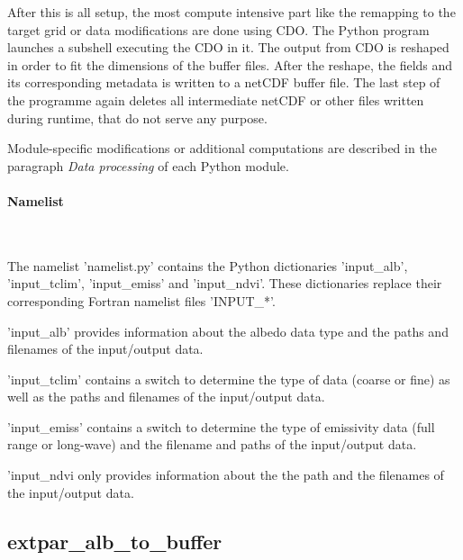 \documentclass[a4paper,10pt,DIV14,BCOR1cm,titlepage,twoside]{scrartcl}
\begin{document}
\noindent After this is all setup, the most compute intensive part like the remapping to the target grid or data modifications are done using CDO. The Python program launches a subshell executing the CDO in it.
The output from CDO is reshaped in order to fit the dimensions of the buffer files. After the reshape, the fields and its corresponding metadata is written to a netCDF buffer file. The last step of the programme again deletes all intermediate netCDF or other files written during runtime, that do not serve any purpose.

\noindent Module-specific modifications or additional computations are described in the paragraph \textit{Data processing} of each Python module.
\paragraph{Namelist}\ \par\medskip\noindent
\noindent The namelist 'namelist.py' contains the Python dictionaries 'input\_alb', 'input\_tclim', 'input\_emiss' and 'input\_ndvi'. These dictionaries replace their corresponding Fortran namelist files 'INPUT\_*'.

\noindent 'input\_alb' provides information about the albedo data type and the paths and filenames of the input/output data.

\noindent'input\_tclim' contains a switch to determine the type of data (coarse or fine) as well as the paths and filenames of the input/output data.

\noindent'input\_emiss' contains a switch to determine the type of emissivity data (full range or long-wave) and the filename and paths of the input/output data.

\noindent'input\_ndvi only provides information about the the path and the filenames of the input/output data.

\subsection{extpar\_alb\_to\_buffer}\label{extpar_alb_to_buffer}
\end{document}
